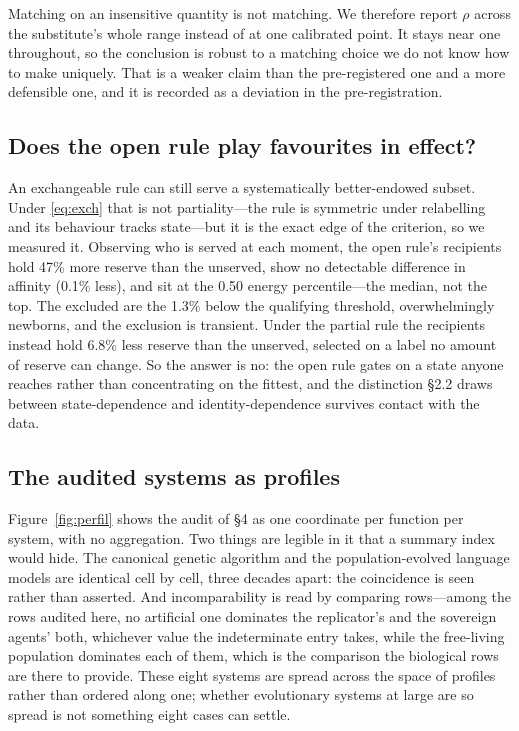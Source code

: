 \documentclass[review,3p,times]{elsarticle}
\begin{document}
Matching on an insensitive quantity is not matching. We therefore report
$\rho$ across the substitute's whole range instead of at one calibrated
point. It stays near one throughout, so the conclusion is robust to a
matching choice we do not know how to make uniquely. That is a weaker
claim than the pre-registered one and a more defensible one, and it is
recorded as a deviation in the pre-registration.

\subsection{Does the open rule play favourites in effect?}

An exchangeable rule can still serve a systematically
better-endowed subset. Under \eqref{eq:exch} that is not
partiality---the rule is symmetric under relabelling and its
behaviour tracks state---but it is the exact edge of the
criterion, so we measured it. Observing who is served at each
moment, the open rule's recipients hold 47\% more reserve than the unserved, show no detectable difference in
affinity (0.1\% less), and sit at the 0.50 energy percentile---the median, not
the top. The excluded are the 1.3\% below the qualifying threshold, overwhelmingly newborns, and
the exclusion is transient.
Under the partial rule the recipients instead hold 6.8\% less reserve than the unserved, selected on
a label no amount of reserve can change.
So the answer is no: the open rule gates on a state anyone
reaches rather than concentrating on the fittest, and the
distinction \S2.2 draws between state-dependence and
identity-dependence survives contact with the data.

\subsection{The audited systems as profiles}

Figure~\ref{fig:perfil} shows the audit of \S4 as one coordinate per
function per system, with no aggregation. Two things are legible in it
that a summary index would hide. The canonical genetic algorithm and
the population-evolved language models are identical cell by cell,
three decades apart: the coincidence is seen rather than asserted. And
incomparability is read by comparing rows---among the rows audited
here, no artificial one
dominates the replicator's and the sovereign agents' both, whichever
value the indeterminate entry takes, while the free-living population
dominates each of them, which is the comparison the biological rows are
there to provide. These eight systems are spread across the space of
profiles rather than ordered along one; whether evolutionary systems at
large are so spread is not something eight cases can settle.
\end{document}
